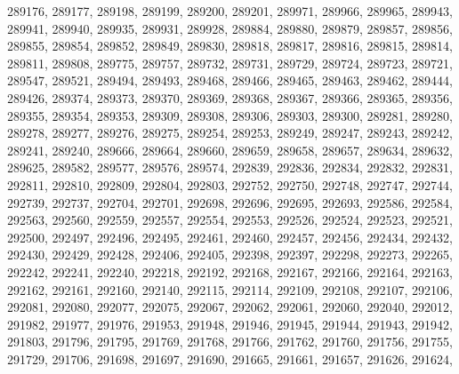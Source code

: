 \begin{appendix}
\begin{itemize}
     289176, 289177, 289198, 289199, 289200, 289201, 289971, 289966, 289965, 289943,\\
     289941, 289940, 289935, 289931, 289928, 289884, 289880, 289879, 289857, 289856,\\
     289855, 289854, 289852, 289849, 289830, 289818, 289817, 289816, 289815, 289814,\\
     289811, 289808, 289775, 289757, 289732, 289731, 289729, 289724, 289723, 289721,\\
     289547, 289521, 289494, 289493, 289468, 289466, 289465, 289463, 289462, 289444,\\
     289426, 289374, 289373, 289370, 289369, 289368, 289367, 289366, 289365, 289356,\\
     289355, 289354, 289353, 289309, 289308, 289306, 289303, 289300, 289281, 289280,\\
     289278, 289277, 289276, 289275, 289254, 289253, 289249, 289247, 289243, 289242,\\
     289241, 289240, 289666, 289664, 289660, 289659, 289658, 289657, 289634, 289632,\\
     289625, 289582, 289577, 289576, 289574, 292839, 292836, 292834, 292832, 292831,\\
     292811, 292810, 292809, 292804, 292803, 292752, 292750, 292748, 292747, 292744,\\
     292739, 292737, 292704, 292701, 292698, 292696, 292695, 292693, 292586, 292584,\\
     292563, 292560, 292559, 292557, 292554, 292553, 292526, 292524, 292523, 292521,\\
     292500, 292497, 292496, 292495, 292461, 292460, 292457, 292456, 292434, 292432,\\
     292430, 292429, 292428, 292406, 292405, 292398, 292397, 292298, 292273, 292265,\\
     292242, 292241, 292240, 292218, 292192, 292168, 292167, 292166, 292164, 292163,\\
     292162, 292161, 292160, 292140, 292115, 292114, 292109, 292108, 292107, 292106,\\
     292081, 292080, 292077, 292075, 292067, 292062, 292061, 292060, 292040, 292012,\\
     291982, 291977, 291976, 291953, 291948, 291946, 291945, 291944, 291943, 291942,\\
     291803, 291796, 291795, 291769, 291768, 291766, 291762, 291760, 291756, 291755,\\
     291729, 291706, 291698, 291697, 291690, 291665, 291661, 291657, 291626, 291624,\\

\end{itemize}
\end{appendix}

